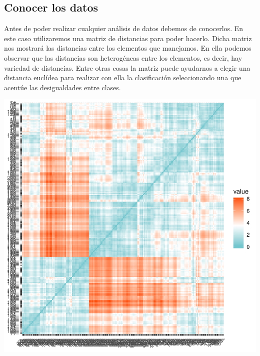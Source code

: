 \documentclass [a4paper] {article}
\begin{document}
\newpage
\subsection{Conocer los datos}
Antes de poder realizar cualquier análisis de datos debemos de conocerlos.
En este caso utilizaremos una matriz de distancias para poder hacerlo.
Dicha matriz nos mostrará las distancias entre los elementos que manejamos.
En ella podemos observar que las distancias son heterogéneas entre los elementos, es decir, hay variedad de distancias.
Entre otras cosas la matriz puede ayudarnos a elegir una distancia euclídea para realizar con ella la clasificación seleccionando una que acentúe las desigualdades entre clases.
\begin{center}
\begin{Schunk}
\end{Schunk}
\includegraphics{entrega-kmeans_distances}
\end{center}

\newpage
\end{document}
